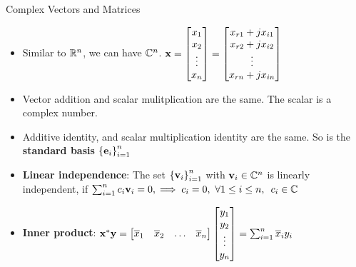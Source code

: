 \documentclass[aspectratio=169]{beamer}
\let\olditem\item
\renewcommand{\item}{\setlength{\itemsep}{\fill}\olditem}
\def\mf{\ensuremath\mathbf}
\def\mb{\ensuremath\mathbb}
\begin{document}
\begin{frame}[t]{Complex Vectors and Matrices}
  \begin{itemize}
      \item Similar to $\mb{R}^n$, we can have $\mb{C}^n$. $\mf{x} = \begin{bmatrix*}x_{1}\\x_{2}\\\vdots\\x_{n}\end{bmatrix*} = \begin{bmatrix*}x_{r1} + jx_{i1}\\x_{r2} + jx_{i2}\\\vdots\\x_{rn} + jx_{in}\end{bmatrix*}$
      
      \item Vector addition and scalar mulitplication are the same. The scalar is a complex number.
      
      \item Additive identity, and scalar multiplication identity are the same. So is the \textbf{standard basis} $\left\{\mf{e}_i\right\}_{i=1}^{n}$
      
      \item \textbf{Linear independence}: The set $\left\{\mf{v}_i\right\}_{i=1}^n$ with $\mf{v}_i \in \mb{C}^n$ is linearly independent, if  $\sum_{i=1}^nc_i\mf{v}_i = 0, \implies c_i = 0, \,\, \forall 1 \leq i \leq n, \,\,\, c_i \in \mb{C}$
      
      \item \textbf{Inner product}: $\mf{x}^{*}\mf{y} = \begin{bmatrix*}\overline{x}_1&\overline{x}_2&\ldots&\overline{x}_n\end{bmatrix*}\begin{bmatrix*}y_1\\y_2\\\vdots\\y_n\end{bmatrix*} = \sum_{i=1}^n\overline{x}_iy_i$
  
  \end{itemize}
  \end{frame}
  
\end{document}
